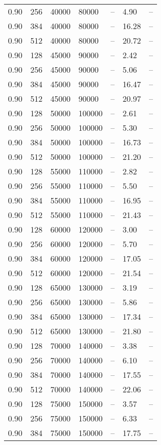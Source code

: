 \begin{tabular}{l|l|l|l|l|l|l}
0.90 & 256 &  40000 &  80000 & -- &  4.90 & --\\
0.90 & 384 &  40000 &  80000 & -- & 16.28 & --\\
0.90 & 512 &  40000 &  80000 & -- & 20.72 & --\\
0.90 & 128 &  45000 &  90000 & -- &  2.42 & --\\
0.90 & 256 &  45000 &  90000 & -- &  5.06 & --\\
0.90 & 384 &  45000 &  90000 & -- & 16.47 & --\\
0.90 & 512 &  45000 &  90000 & -- & 20.97 & --\\
0.90 & 128 &  50000 & 100000 & -- &  2.61 & --\\
0.90 & 256 &  50000 & 100000 & -- &  5.30 & --\\
0.90 & 384 &  50000 & 100000 & -- & 16.73 & --\\
0.90 & 512 &  50000 & 100000 & -- & 21.20 & --\\
0.90 & 128 &  55000 & 110000 & -- &  2.82 & --\\
0.90 & 256 &  55000 & 110000 & -- &  5.50 & --\\
0.90 & 384 &  55000 & 110000 & -- & 16.95 & --\\
0.90 & 512 &  55000 & 110000 & -- & 21.43 & --\\
0.90 & 128 &  60000 & 120000 & -- &  3.00 & --\\
0.90 & 256 &  60000 & 120000 & -- &  5.70 & --\\
0.90 & 384 &  60000 & 120000 & -- & 17.05 & --\\
0.90 & 512 &  60000 & 120000 & -- & 21.54 & --\\
0.90 & 128 &  65000 & 130000 & -- &  3.19 & --\\
0.90 & 256 &  65000 & 130000 & -- &  5.86 & --\\
0.90 & 384 &  65000 & 130000 & -- & 17.34 & --\\
0.90 & 512 &  65000 & 130000 & -- & 21.80 & --\\
0.90 & 128 &  70000 & 140000 & -- &  3.38 & --\\
0.90 & 256 &  70000 & 140000 & -- &  6.10 & --\\
0.90 & 384 &  70000 & 140000 & -- & 17.55 & --\\
0.90 & 512 &  70000 & 140000 & -- & 22.06 & --\\
0.90 & 128 &  75000 & 150000 & -- &  3.57 & --\\
0.90 & 256 &  75000 & 150000 & -- &  6.33 & --\\
0.90 & 384 &  75000 & 150000 & -- & 17.75 & --\\

\end{tabular}
